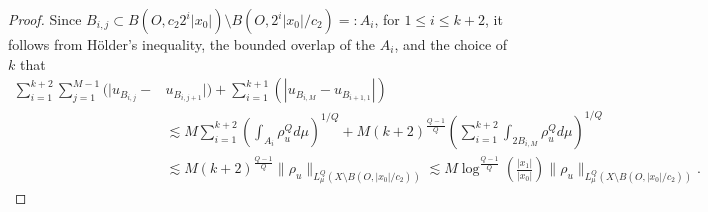 \documentclass[10pt]{amsart}
\numberwithin{equation}{section}
\begin{document}
\begin{proof}
    Since $B_{i,j}\subset B(O,c_2 2^i|x_0|)\setminus B(O,2^i|x_0|/c_2)=:A_i$, for $1\le i\le k+2$, it follows 
    from H\"older's inequality, the bounded overlap of the $A_i$, and the choice of $k$ that
    \begin{align}\label{eq:2806-3}
        \sum_{i=1}^{k+2}\sum_{j=1}^{M-1}(|u_{B_{i,j}}-&u_{B_{i,j+1}}|)+\sum_{i=1}^{k+1}(|u_{B_{i,M}}-u_{B_{i+1,1}}|)\nonumber\\
        &\lesssim M\sum_{i=1}^{k+2}\left(\int_{A_i}\rho_u^Qd\mu\right)^{1/Q}+M(k+2)^{\frac{Q-1}{Q}}\left(\sum_{i=1}^{k+2}\int_{2B_{i,M}}\rho_u^Qd\mu\right)^{1/Q}\nonumber\\
        &\lesssim M(k+2)^{\frac{Q-1}{Q}}\|\rho_u\|_{L^Q_\mu(X\setminus B(O,|x_0|/c_2))}\lesssim M\log^{\frac{Q-1}{Q}}\left(\frac{|x_1|}{|x_0|}\right)\|\rho_u\|_{L^Q_\mu(X\setminus B(O,|x_0|/c_2))}.
    \end{align}


\end{proof}
\end{document}
